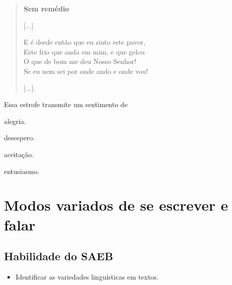 \begin{verse}
\textbf{Sem remédio}

{[}...{]}

E é desde então que eu sinto este pavor,\\
Este frio que anda em mim, e que gelou\\
O que de bom me deu Nosso Senhor!\\
Se eu nem sei por onde ando e onde vou!

{[}...{]}.

\end{verse}

Essa estrofe transmite um sentimento de

\begin{minipage}{.5\textwidth}
\begin{escolha}
\item alegria.

\item desespero.

\item aceitação.

\item entusiasmo.
\end{escolha}
\end{minipage}


\chapter[Modos variados de se escrever e falar]{\Large Modos variados de se escrever e falar}


\section*{Habilidade do SAEB}

\begin{itemize}
\item Identificar as variedades linguísticas em textos.
\end{itemize}

